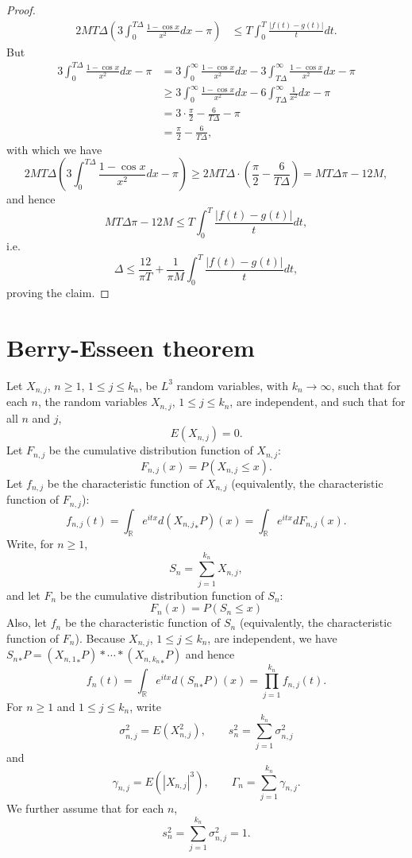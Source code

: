 \documentclass{article}
\theoremstyle{definition}
\begin{document}
\begin{proof}
\begin{align*}
2MT\Delta\left(3\int_0^{T\Delta} \frac{1-\cos x}{x^2} dx - \pi\right)&\leq T \int_0^T \frac{|f(t)-g(t)|}{t} dt.
\end{align*}
But
\begin{align*}
3\int_0^{T\Delta} \frac{1-\cos x}{x^2} dx - \pi &=
3\int_0^\infty \frac{1-\cos x}{x^2} dx - 3 \int_{T\Delta}^\infty \frac{1-\cos x}{x^2} dx - \pi\\
&\geq  3\int_0^\infty \frac{1-\cos x}{x^2} dx  - 6 \int_{T\Delta}^\infty \frac{1}{x^2} dx - \pi\\
&=3\cdot \frac{\pi}{2} - \frac{6}{T\Delta} - \pi\\
&=\frac{\pi}{2}-\frac{6}{T\Delta},
\end{align*}
with which we have
\[
2MT\Delta\left(3\int_0^{T\Delta} \frac{1-\cos x}{x^2} dx - \pi\right) \geq 2MT\Delta \cdot \left(\frac{\pi}{2}-\frac{6}{T\Delta}\right)
=MT\Delta \pi - 12M,
\]
and hence
\[
MT\Delta \pi - 12M \leq T \int_0^T \frac{|f(t)-g(t)|}{t} dt,
\]
i.e. 
\[
\Delta \leq \frac{12}{\pi T} + \frac{1}{\pi M} \int_0^T \frac{|f(t)-g(t)|}{t} dt,
\]
proving the claim.
\end{proof}



\section{Berry-Esseen theorem}
Let $X_{n,j}$, $n \geq 1$, $1 \leq j \leq k_n$, be $L^3$ random variables, with $k_n \to \infty$,
such that for each $n$, the random variables $X_{n,j}$, $1 \leq j \leq k_n$, are independent, and such that
for all $n$ and $j$,
\[
E(X_{n,j})=0.
\]
Let $F_{n,j}$ be the cumulative distribution function of $X_{n,j}$:
\[
F_{n,j}(x) = P(X_{n,j} \leq x).
\]
Let $f_{n,j}$ be the characteristic function of $X_{n,j}$ (equivalently, the characteristic function of $F_{n,j}$):
\[
f_{n,j}(t) = \int_\mathbb{R} e^{itx} d({X_{n,j}}_*P)(x)
=\int_\mathbb{R} e^{itx} dF_{n,j}(x).
\]
Write, for $n \geq 1$,
\[
S_n = \sum_{j=1}^{k_n} X_{n,j},
\]
and let $F_n$ be the cumulative distribution function of $S_n$:
\[
F_n(x) = P(S_n \leq x)
\]
Also, let $f_n$ be the characteristic function of $S_n$ (equivalently, the characteristic function of $F_n$). Because
$X_{n,j}$, $1 \leq j \leq k_n$, are independent, we have ${S_n}_*P=({X_{n,1}}_*P) * \cdots * ({X_{n,k_n}}_*P)$ and hence
\[
f_n(t) = \int_\mathbb{R} e^{itx} d({S_n}_*P)(x)
=\prod_{j=1}^{k_n} f_{n,j}(t).
\]
For $n \geq 1$ and $1 \leq j \leq k_n$, write
\[
\sigma_{n,j}^2 = E(X_{n,j}^2), \qquad s_n^2 = \sum_{j=1}^{k_n} \sigma_{n,j}^2
\]
and
\[
\gamma_{n,j} = E(|X_{n,j}|^3), \qquad \Gamma_n = \sum_{j=1}^{k_n} \gamma_{n,j}.
\]
We further assume that for each $n$,
\begin{equation}
s_n^2 = \sum_{j=1}^{k_n} \sigma_{n,j}^2 = 1.
\label{sn}
\end{equation}
\end{document}
